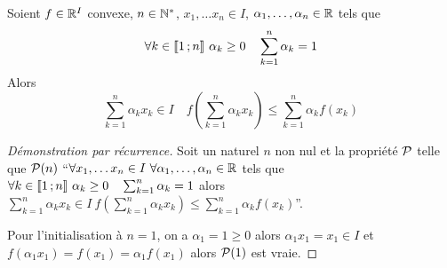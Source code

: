 \begin{theo}
  Soient $f \in \R^I$ convexe, $n \in \N^*$, $x_1, \ldots x_n \in I$, $\alpha_1, \ldots, \alpha_n \in \R$ tels que
  \begin{equation}
    \forall k \in \intervalleentier{1}{n} \ \alpha_k \geq 0 \quad \sum_{k=1}^n \alpha_k = 1
  \end{equation}
  Alors
  \begin{equation}
    \sum_{k=1}^n \alpha_k x_k \in I \quad f\left(\sum_{k=1}^n \alpha_k x_k \right) \leq \sum_{k=1}^n \alpha_k f(x_k)
  \end{equation}
\end{theo}
\begin{proof}[Démonstration par récurrence]
  Soit un naturel $n$ non nul et la propriété $\P$ telle que $\P(n)$ ``$\forall x_1, \ldots x_n \in I \ \forall \alpha_1, \ldots, \alpha_n \in \R$ tels que $\forall k \in \intervalleentier{1}{n} \ \alpha_k \geq 0 \quad \sum_{k=1}^n \alpha_k = 1$ alors $\sum_{k=1}^n \alpha_k x_k \in I \ f\left(\sum_{k=1}^n \alpha_k x_k \right) \leq \sum_{k=1}^n \alpha_k f(x_k)$''.

Pour l'initialisation à $n=1$, on a $\alpha_1=1 \geq 0$ alors $\alpha_1 x_1=x_1 \in I$ et $f(\alpha_1 x_1)=f(x_1)=\alpha_1f(x_1)$ alors $\P(1)$ est vraie.


\end{proof}
